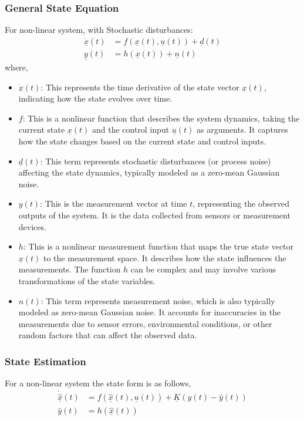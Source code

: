 \subsubsection{General State Equation}
For non-linear system, with Stochastic disturbances:
$$
\begin{aligned}
	\dot{\underline{x}}(t) &= f\left( \underline{x}(t), \underline{u}(t) \right) + \underline{d}(t) \\
	\underline{y}(t) &= h\left( \underline{x}(t) \right) + \underline{n}(t)
\end{aligned}
$$
where,
\begin{itemize}
	\item $ \dot{\underline{x}}(t) $: This represents the time derivative of the state vector $ \underline{x}(t) $, indicating how the state evolves over time.
	\item $ f $: This is a nonlinear function that describes the system dynamics, taking the current state $ \underline{x}(t) $ and the control input $ \underline{u}(t) $ as arguments. It captures how the state changes based on the current state and control inputs.
	\item $ \underline{d}(t) $: This term represents stochastic disturbances (or process noise) affecting the state dynamics, typically modeled as a zero-mean Gaussian noise.
	\item $ y(t) $: This is the measurement vector at time $ t $, representing the observed outputs of the system. It is the data collected from sensors or measurement devices.
	\item $ h $: This is a nonlinear measurement function that maps the true state vector $ \underline{x}(t) $ to the measurement space. It describes how the state influences the measurements. The function $ h $ can be complex and may involve various transformations of the state variables.
	\item $ n(t) $: This term represents measurement noise, which is also typically modeled as zero-mean Gaussian noise. It accounts for inaccuracies in the measurements due to sensor errors, environmental conditions, or other random factors that can affect the observed data.
\end{itemize}

\subsubsection{State Estimation}
For a non-linear system the state form is as follows,
$$
\begin{aligned}
	\dot{\hat{\underline{x}}}(t) &= f\left( \underline{\hat{x}}(t), \underline{u}(t) \right) + \underline{K}\left( y(t) - \hat{y}(t) \right) \\
	\hat{y}(t) &= h\left( \underline{\hat{x}}(t) \right)
\end{aligned}
$$

